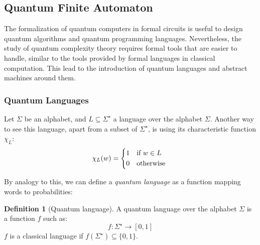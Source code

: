 \documentclass[12pt,a4paper]{article}
\theoremstyle{plain}
\theoremstyle{definition}
\newtheorem*{definition}{Definition}
\begin{document}
\subsection{Quantum Finite Automaton}
The formalization of quantum computers in formal circuits is useful to design quantum algorithms and quantum programming languages. Nevertheless, the study of quantum complexity theory requires formal tools that are easier to handle, similar to the tools provided by formal languages in classical computation. This lead to the introduction \cite{quantum-automata-grammars} of quantum languages and abstract machines around them.
\subsubsection{Quantum Languages}
Let $\Sigma$ be an alphabet, and $L\subseteq \Sigma^\star$ a language over the alphabet $\Sigma$. Another way to see this language, apart from a subset of $\Sigma^\star$, is using its characteristic function $\chi_L$:
\begin{equation*}
    \chi_L(w) = \begin{cases*}
        1 & if $w\in L$\\
        0 & otherwise
    \end{cases*}
\end{equation*}

By analogy to this, we can define a \emph{quantum language} as a function mapping words to probabilities: \cite{quantum-automata-grammars}
\begin{definition}[Quantum language]
    A quantum language over the alphabet $\Sigma$ is a function $f$ such as:
    \begin{equation*}
        f : \Sigma^\star \to [0, 1]
    \end{equation*}
    $f$ is a classical language if $f(\Sigma^\star) \subseteq \{0, 1\}$.
\end{definition}
\end{document}
